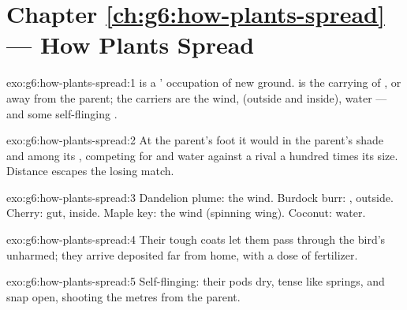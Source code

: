 \section*{Chapter \ref{ch:g6:how-plants-spread} --- How Plants Spread}

\begin{solution}{exo:g6:how-plants-spread:1}
 is a ' occupation of new ground.
 is the carrying of ,  or  away
from the parent; the carriers are the wind,  (outside
and inside), water --- and some self-flinging .
\end{solution}

\begin{solution}{exo:g6:how-plants-spread:2}
At the parent's foot it would  in the parent's shade
and among its , competing for  and water against a
rival a hundred times its size. Distance escapes the losing
match.
\end{solution}

\begin{solution}{exo:g6:how-plants-spread:3}
Dandelion plume: the wind. Burdock burr:  , outside.
Cherry:  gut, inside. Maple key: the wind (spinning
wing). Coconut: water.
\end{solution}

\begin{solution}{exo:g6:how-plants-spread:4}
Their tough coats let them pass through the bird's 
unharmed; they arrive deposited far from home, with a dose of
fertilizer.
\end{solution}

\begin{solution}{exo:g6:how-plants-spread:5}
Self-flinging: their pods dry, tense like springs, and snap
open, shooting the  metres from the parent.
\end{solution}

